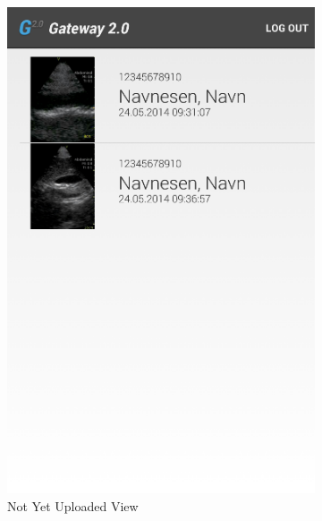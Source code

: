 \begin{figure}[H]
\centering
    \begin{subfigure}[b]{0.49\textwidth}
        \includegraphics[width=\textwidth]{img/interface/10-NotYetUploaded.png}
        \caption*{Not Yet Uploaded View}
        \label{fig:11notyetuploaded}
    \end{subfigure}
    \begin{subfigure}[b]{0.49\textwidth}

\end{subfigure}
\end{figure}
